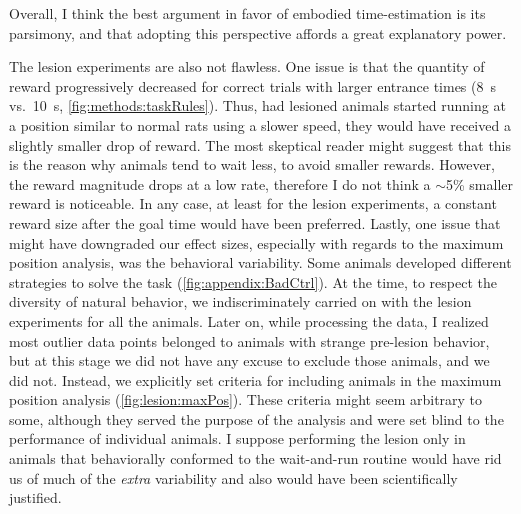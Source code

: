 Overall, I think the best argument in favor of embodied time-estimation is its parsimony, and that adopting this perspective affords a great explanatory power.
\par
The lesion experiments are also not flawless.
One issue is that the quantity of reward progressively decreased for correct trials with larger entrance times (8~s vs.\ 10~s, \autoref{fig:methods:taskRules}).
Thus, had lesioned animals started running at a position similar to normal rats using a slower speed, they would have received a slightly smaller drop of reward.
The most skeptical reader might suggest that this is the reason why animals tend to wait less, to avoid smaller rewards.
However, the reward magnitude drops at a low rate, therefore I do not think a $\sim$5\% smaller reward is noticeable.
In any case, at least for the lesion experiments, a constant reward size after the goal time would have been preferred.
Lastly, one issue that might have downgraded our effect sizes, especially with regards to the maximum position analysis, was the behavioral variability.
Some animals developed different strategies to solve the task (\autoref{fig:appendix:BadCtrl}).
At the time, to respect the diversity of natural behavior, we indiscriminately carried on with the lesion experiments for all the animals.
Later on, while processing the data, I realized most outlier data points belonged to animals with strange pre-lesion behavior, but at this stage we did not have any excuse to exclude those animals, and we did not.
Instead, we explicitly set criteria for including animals in the maximum position analysis (\autoref{fig:lesion:maxPos}).
These criteria might seem arbitrary to some, although they served the purpose of the analysis and were set blind to the performance of individual animals.
I suppose performing the lesion only in animals that behaviorally conformed to the wait-and-run routine would have rid us of much of the \textit{extra} variability and also would have been scientifically justified.



